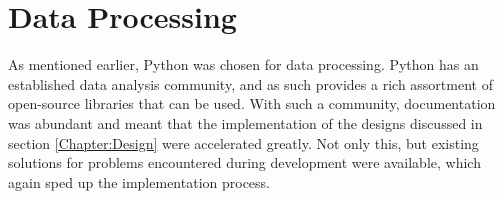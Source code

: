 \section{Data Processing}
As mentioned earlier, Python was chosen for data processing. Python has an established data analysis community, and as such provides a rich assortment of open-source libraries that can be used. With such a community, documentation was abundant and meant that the implementation of the designs discussed in section \ref{Chapter:Design} were accelerated greatly. Not only this, but existing solutions for problems encountered during development were available, which again sped up the implementation process. 





